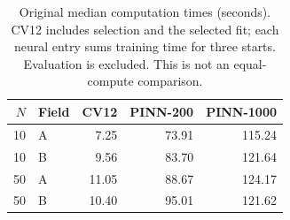 \normalsize
\begin{table}[htbp]\centering\small
\caption{Original median computation times (seconds). CV12 includes selection and the selected fit; each neural entry sums training time for three starts. Evaluation is excluded. This is not an equal-compute comparison.}\label{tab:cost}
\begin{tabular}{rlrrr}\toprule
$N$ & Field & CV12 & PINN-200 & PINN-1000\\\midrule
10 & A & 7.25 & 73.91 & 115.24\\
10 & B & 9.56 & 83.70 & 121.64\\
50 & A & 11.05 & 88.67 & 124.17\\
50 & B & 10.40 & 95.01 & 121.62\\
\bottomrule\end{tabular}
\end{table}
